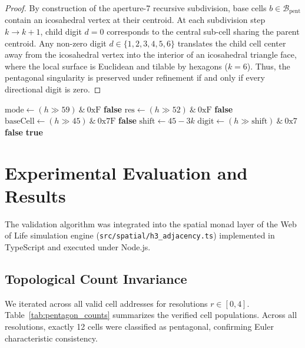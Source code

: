 \documentclass[10pt,twocolumn]{article}
\begin{document}
\begin{proof}
By construction of the aperture-7 recursive subdivision, base cells $b \in \mathcal{B}_{\text{pent}}$ contain an icosahedral vertex at their centroid. At each subdivision step $k \to k + 1$, child digit $d = 0$ corresponds to the central sub-cell sharing the parent centroid. Any non-zero digit $d \in \{1, 2, 3, 4, 5, 6\}$ translates the child cell center away from the icosahedral vertex into the interior of an icosahedral triangle face, where the local surface is Euclidean and tilable by hexagons ($k=6$). Thus, the pentagonal singularity is preserved under refinement if and only if every directional digit is zero.
\end{proof}

\begin{algorithm}[t]
\caption{$O(1)$ Bitwise Pentagon Topology Validation}
\label{alg:is_pentagon}
\begin{algorithmic}[1]
    \State $\text{mode} \gets (h \gg 59) \ \& \ 0\text{xF}$
     \Return \textbf{false} \EndIf
    \State $\text{res} \gets (h \gg 52) \ \& \ 0\text{xF}$
     \Return \textbf{false} \EndIf
    \State $\text{baseCell} \gets (h \gg 45) \ \& \ 0\text{x7F}$
     \Return \textbf{false} \EndIf
        \State $\text{shift} \gets 45 - 3k$
        \State $\text{digit} \gets (h \gg \text{shift}) \ \& \ 0\text{x7}$
         \Return \textbf{false} \EndIf
    \EndFor
    \State \Return \textbf{true}
\EndFunction
\end{algorithmic}
\end{algorithm}

\section{Experimental Evaluation and Results}

The validation algorithm was integrated into the spatial monad layer of the Web of Life simulation engine (\texttt{src/spatial/h3\_adjacency.ts}) implemented in TypeScript and executed under Node.js.

\subsection{Topological Count Invariance}
We iterated across all valid cell addresses for resolutions $r \in [0, 4]$. Table~\ref{tab:pentagon_counts} summarizes the verified cell populations. Across all resolutions, exactly 12 cells were classified as pentagonal, confirming Euler characteristic consistency.
\end{document}

